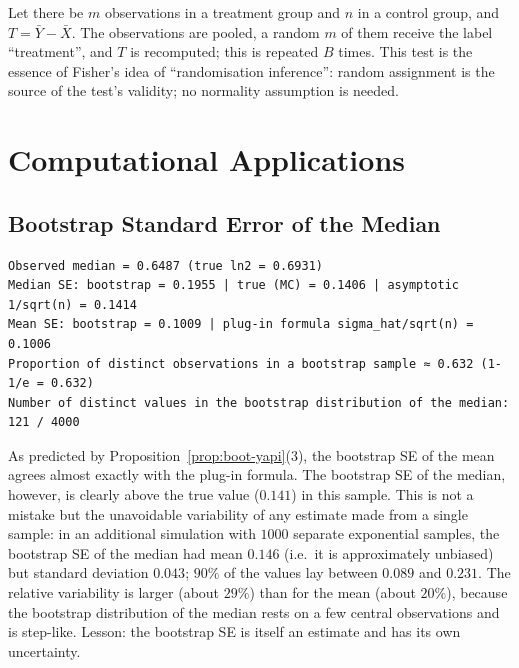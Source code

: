 \documentclass[main.tex]{subfiles}
\begin{document}
\begin{example}
Let there be $m$ observations in a treatment group and $n$ in a control group, and $T=\bar Y-\bar X$. The observations are pooled, a random $m$ of them receive the label ``treatment'', and $T$ is recomputed; this is repeated $B$ times. This test is the essence of Fisher's \cite{fisher35} idea of ``randomisation inference'': random assignment is the source of the test's validity; no normality assumption is needed.
\end{example}

\section{Computational Applications}

\subsection{Bootstrap Standard Error of the Median}

\begin{lstlisting}[style=output]
Observed median = 0.6487 (true ln2 = 0.6931)
Median SE: bootstrap = 0.1955 | true (MC) = 0.1406 | asymptotic 1/sqrt(n) = 0.1414
Mean SE: bootstrap = 0.1009 | plug-in formula sigma_hat/sqrt(n) = 0.1006
Proportion of distinct observations in a bootstrap sample ≈ 0.632 (1-1/e = 0.632)
Number of distinct values in the bootstrap distribution of the median: 121 / 4000
\end{lstlisting}

As predicted by Proposition~\ref{prop:boot-yapi}(3), the bootstrap SE of the mean agrees almost exactly with the plug-in formula. The bootstrap SE of the median, however, is clearly above the true value ($0.141$) in this sample. This is not a mistake but the unavoidable variability of any estimate made from a single sample: in an additional simulation with $1000$ separate exponential samples, the bootstrap SE of the median had mean $0.146$ (i.e.\ it is approximately unbiased) but standard deviation $0.043$; $90\%$ of the values lay between $0.089$ and $0.231$. The relative variability is larger (about $29\%$) than for the mean (about $20\%$), because the bootstrap distribution of the median rests on a few central observations and is step-like. Lesson: the bootstrap SE is itself an estimate and has its own uncertainty.
\end{document}

